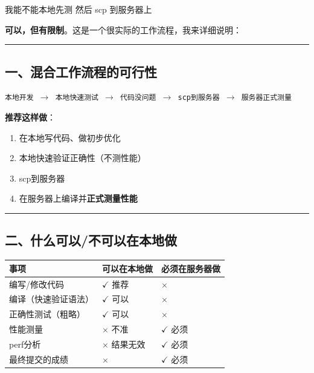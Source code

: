 \documentclass[11pt, a4paper]{article}
\begin{document}
\vspace{1.5em}

\begin{userbox}
我能不能本地先测 然后 scp 到服务器上
\end{userbox}

\begin{aibox}
\textbf{可以，但有限制}。这是一个很实际的工作流程，我来详细说明：

\begin{center}\rule{\textwidth}{0.4pt}\end{center}

\subsection*{一、混合工作流程的可行性}

\begin{tcolorbox}[colback=white,colframe=gray!50!white,boxrule=0.5pt,arc=2pt,left=5pt,right=5pt,top=5pt,bottom=5pt]
\texttt{本地开发 $\rightarrow$ 本地快速测试 $\rightarrow$ 代码没问题 $\rightarrow$ scp到服务器 $\rightarrow$ 服务器正式测量}
\end{tcolorbox}

\textbf{推荐这样做}：
\begin{enumerate}
    \item 在本地写代码、做初步优化
    \item 本地快速验证正确性（不测性能）
    \item scp到服务器
    \item 在服务器上编译并\textbf{正式测量性能}
\end{enumerate}

\begin{center}\rule{\textwidth}{0.4pt}\end{center}

\subsection*{二、什么可以/不可以在本地做}

\vspace{0.5em}
\begin{tabularx}{\textwidth}{@{} X l l @{}}
\toprule
事项 & 可以在本地做 & 必须在服务器做 \\
\midrule
编写/修改代码 & $\checkmark$ 推荐 & $\times$ \\
编译（快速验证语法） & $\checkmark$ 可以 & $\times$ \\
正确性测试（粗略） & $\checkmark$ 可以 & $\times$ \\
性能测量 & $\times$ 不准 & $\checkmark$ 必须 \\
perf分析 & $\times$ 结果无效 & $\checkmark$ 必须 \\
最终提交的成绩 & $\times$ & $\checkmark$ 必须 \\
\bottomrule
\end{tabularx}
\vspace{0.5em}


\end{aibox}
\end{document}
